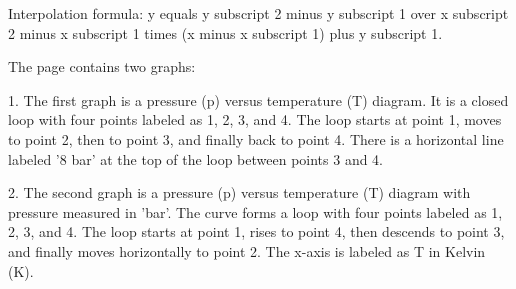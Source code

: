 Interpolation formula:
y equals y subscript 2 minus y subscript 1 over x subscript 2 minus x subscript 1 times (x minus x subscript 1) plus y subscript 1.

The page contains two graphs:

1. The first graph is a pressure (p) versus temperature (T) diagram. It is a closed loop with four points labeled as 1, 2, 3, and 4. The loop starts at point 1, moves to point 2, then to point 3, and finally back to point 4. There is a horizontal line labeled '8 bar' at the top of the loop between points 3 and 4.

2. The second graph is a pressure (p) versus temperature (T) diagram with pressure measured in 'bar'. The curve forms a loop with four points labeled as 1, 2, 3, and 4. The loop starts at point 1, rises to point 4, then descends to point 3, and finally moves horizontally to point 2. The x-axis is labeled as T in Kelvin (K).
